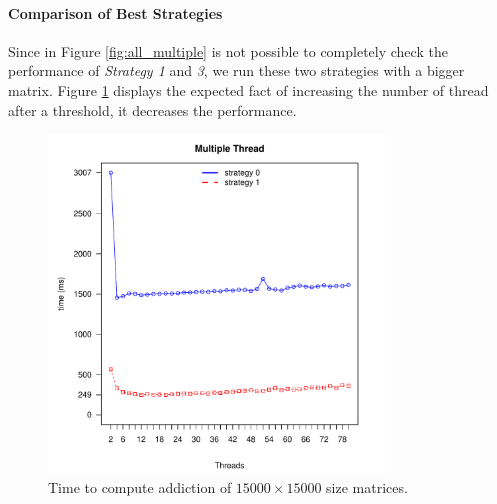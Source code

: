 \documentclass[]{article}
\begin{document}
\paragraph{Comparison of Best Strategies}
Since in Figure \ref{fig:all_multiple} is not possible to completely check the performance of \textit{Strategy 1} and \textit{3}, we run these two strategies with a bigger matrix. Figure \ref{fig:strategy_1_3} displays the expected fact of increasing the number of thread after a threshold, it decreases the performance.
\begin{figure}[H]
    \centering
    \includegraphics[width=0.8\textwidth]{img/strategy_1_3.pdf}
    \caption
    {Time to compute addiction of $15000\times 15000$ size matrices.}
    \label{fig:strategy_1_3}
\end{figure}
\end{document}
